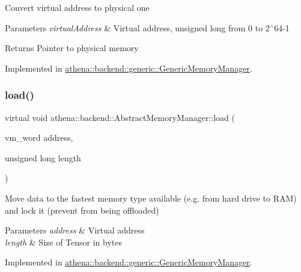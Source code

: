 Convert virtual address to physical one 
\begin{DoxyParams}{Parameters}
{\em virtual\+Address} & Virtual address, unsigned long from 0 to 2$^\wedge$64-\/1 \\
\hline
\end{DoxyParams}
\begin{DoxyReturn}{Returns}
Pointer to physical memory 
\end{DoxyReturn}


Implemented in \mbox{\hyperlink{classathena_1_1backend_1_1generic_1_1_generic_memory_manager_a7f3dacb56bd95b837910441d0aef1dd8}{athena\+::backend\+::generic\+::\+Generic\+Memory\+Manager}}.

\mbox{\label{classathena_1_1backend_1_1_abstract_memory_manager_af5d4fd46d1bd780edc638aea6b729ff3}} 
\subsubsection{\texorpdfstring{load()}{load()}}
{\footnotesize\ttfamily virtual void athena\+::backend\+::\+Abstract\+Memory\+Manager\+::load (\begin{DoxyParamCaption}\item[{vm\+\_\+word}]{address,  }\item[{unsigned long}]{length }\end{DoxyParamCaption})\hspace{0.3cm}{\ttfamily [pure virtual]}}

Move data to the fastest memory type available (e.\+g. from hard drive to R\+AM) and lock it (prevent from being offloaded) 
\begin{DoxyParams}{Parameters}
{\em address} & Virtual address \\
\hline
{\em length} & Size of Tensor in bytes \\
\hline
\end{DoxyParams}


Implemented in \mbox{\hyperlink{classathena_1_1backend_1_1generic_1_1_generic_memory_manager_a43a30e3c9e0cc2d15defb44dfa3919c0}{athena\+::backend\+::generic\+::\+Generic\+Memory\+Manager}}.

\mbox{\label{classathena_1_1backend_1_1_abstract_memory_manager_a358f614d4358f5dce28f17dba6917b1f}} 
